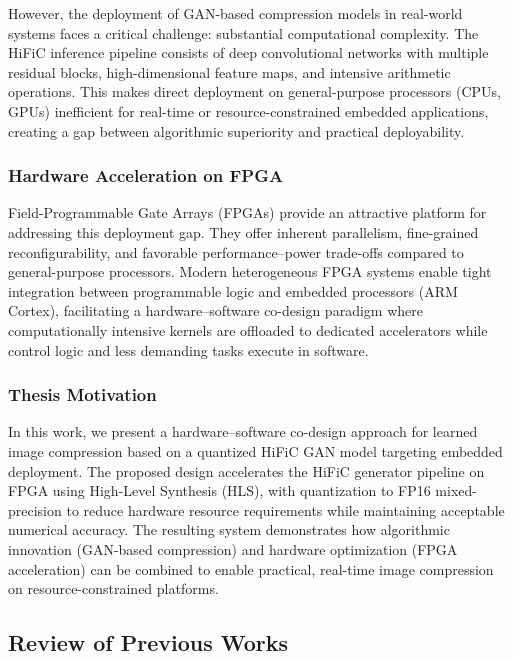 However, the deployment of GAN-based compression models in real-world systems faces a critical challenge: substantial computational complexity. The HiFiC inference pipeline consists of deep convolutional networks with multiple residual blocks, high-dimensional feature maps, and intensive arithmetic operations. This makes direct deployment on general-purpose processors (CPUs, GPUs) inefficient for real-time or resource-constrained embedded applications, creating a gap between algorithmic superiority and practical deployability.

\subsubsection*{Hardware Acceleration on FPGA}

Field-Programmable Gate Arrays (FPGAs) provide an attractive platform for addressing this deployment gap. They offer inherent parallelism, fine-grained reconfigurability, and favorable performance--power trade-offs compared to general-purpose processors. Modern heterogeneous FPGA systems enable tight integration between programmable logic and embedded processors (ARM Cortex), facilitating a hardware--software co-design paradigm where computationally intensive kernels are offloaded to dedicated accelerators while control logic and less demanding tasks execute in software.

\subsubsection*{Thesis Motivation}

In this work, we present a hardware--software co-design approach for learned image compression based on a quantized HiFiC GAN model targeting embedded deployment. The proposed design accelerates the HiFiC generator pipeline on FPGA using High-Level Synthesis (HLS), with quantization to FP16 mixed-precision to reduce hardware resource requirements while maintaining acceptable numerical accuracy. The resulting system demonstrates how algorithmic innovation (GAN-based compression) and hardware optimization (FPGA acceleration) can be combined to enable practical, real-time image compression on resource-constrained platforms.

\subsection{Review of Previous Works}

